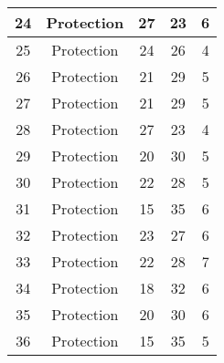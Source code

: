 \documentclass[results.tex]{subfiles}
\begin{document}
\begin{center}
\begin{tabular}{| c || c | c | c | c |}
            \hline
            24                      & Protection                   & 27                     & 23                      & 6                    \\
            \hline
            25                      & Protection                   & 24                     & 26                      & 4                    \\
            \hline
            26                      & Protection                   & 21                     & 29                      & 5                    \\
            \hline
            27                      & Protection                   & 21                     & 29                      & 5                    \\
            \hline
            28                      & Protection                   & 27                     & 23                      & 4                    \\
            \hline
            29                      & Protection                   & 20                     & 30                      & 5                    \\
            \hline
            30                      & Protection                   & 22                     & 28                      & 5                    \\
            \hline
            31                      & Protection                   & 15                     & 35                      & 6                    \\
            \hline
            32                      & Protection                   & 23                     & 27                      & 6                    \\
            \hline
            33                      & Protection                   & 22                     & 28                      & 7                    \\
            \hline
            34                      & Protection                   & 18                     & 32                      & 6                    \\
            \hline
            35                      & Protection                   & 20                     & 30                      & 6                    \\
            \hline
            36                      & Protection                   & 15                     & 35                      & 5                    \\

\end{tabular}
\end{center}
\end{document}
